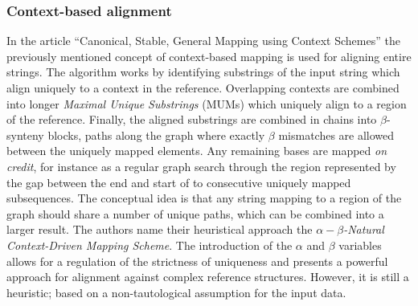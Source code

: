 \documentclass[thesis.tex]{subfiles}
\begin{document}
\subsubsection{Context-based alignment}
\label{sec:canonical}
In the article ``Canonical, Stable, General Mapping using Context Schemes''\cite{canonical_stable_general_mapping_using_context_schemes} the previously mentioned concept of context-based mapping is used for aligning entire strings. The algorithm works by identifying substrings of the input string which align uniquely to a context in the reference. Overlapping contexts are combined into longer \textit{Maximal Unique Substrings} (MUMs) which uniquely align to a region of the reference. Finally, the aligned substrings are combined in chains into $\beta$-synteny blocks, paths along the graph where exactly $\beta$ mismatches are allowed between the uniquely mapped elements. Any remaining bases are mapped \textit{on credit}, for instance as a regular graph search through the region represented by the gap between the end and start of to consecutive uniquely mapped subsequences. The conceptual idea is that any string mapping to a region of the graph should share a number of unique paths, which can be combined into a larger result. The authors name their heuristical approach the \textit{$\alpha-\beta$-Natural Context-Driven Mapping Scheme}. The introduction of the $\alpha$ and $\beta$ variables allows for a regulation of the strictness of uniqueness and presents a powerful approach for alignment against complex reference structures. However, it is still a heuristic; based on a non-tautological assumption for the input data.
\end{document}
